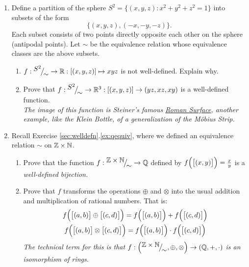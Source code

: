 \begin{exercises}{}{}
\begin{enumerate}
	\item Define a partition of the sphere $S^2=\bigl\{(x,y,z):x^2+y^2+z^2=1\bigr\}$ into subsets of the form
	\[\bigl\{(x,y,z),(-x,-y,-z)\bigr\}.\]
	Each subset consists of two points directly opposite each other on the sphere (antipodal points). Let $\sim$ be the equivalence relation whose equivalence classes are the above subsets.
		\begin{enumerate}
	  	\item $f:{}^{\textstyle {S^2}}\!\big/_{\textstyle \!{\sim}}\to\mathbb{R}:[(x,y,z)]\mapsto xyz$ is not well-defined. Explain why.
	  	\item Prove that $f:{}^{\textstyle {S^2}}\!\big/_{\textstyle \!{\sim}}\to\mathbb{R}^3:[(x,y,z)]\to(yz,xz,xy)$ is a well-defined function.\\
			\emph{The image of this function is Steiner's famous \href{http://en.wikipedia.org/wiki/Roman_surface}{Roman Surface}, another example, like the Klein Bottle, of a generalization of the M\"obius Strip.}
		\end{enumerate}
		
		\item Recall Exercise \ref*{sec:welldefn}.\ref{ex:qequiv}, where we defined an equivalence relation $\sim$ on $\mathbb{Z}\times\mathbb{N}$.
		\begin{enumerate}
			\item	Prove that the function $f:{}^{\textstyle {\mathbb{Z}\times\mathbb{N}}}\!\big/_{\textstyle \!{\sim}}\to\mathbb{Q}$ defined by $f\Bigl(\bigl[(x,y)\bigr]\Bigr)=\frac xy$ is a \emph{well-defined bijection.}
			\item Prove that $f$ transforms the operations $\oplus$ and $\otimes$ into the usual addition and multiplication of rational numbers. That is:
			\begin{gather*}
			f\Bigl(\bigl[(a,b)\bigr]\oplus\bigl[(c,d)\bigr]\Bigr)=f\Bigl(\bigl[(a,b)\bigr]\Bigr)+f\Bigl(\bigl[(c,d)\bigr]\Bigr)\\
			f\Bigl(\bigl[(a,b)\bigr]\otimes\bigl[(c,d)\bigr]\Bigr)=f\Bigl(\bigl[(a,b)\bigr]\Bigr)\cdot f\Bigl(\bigl[(c,d)\bigr]\Bigr)
			\end{gather*}
			\emph{The technical term for this is that $f:\left({}^{\textstyle {\mathbb{Z}\times\mathbb{N}}}\!\big/_{\textstyle \!{\sim}},\oplus,\otimes\right)\to(\mathbb{Q},+,\cdot)$ is an isomorphism of rings.}
		\end{enumerate}
\end{enumerate}

\end{exercises}

